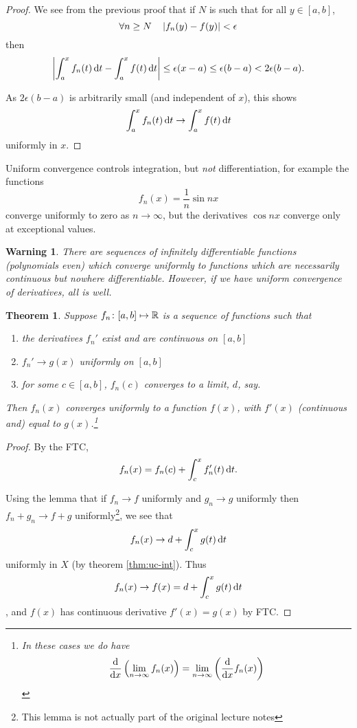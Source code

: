 \documentclass{notes}
\theoremstyle{plain}
\newtheorem{theorem}[proposition]{Theorem}
\newtheorem*{warning}{Warning}
\newcommand{\Forall}[1]{\forall #1 \quad}
\begin{document}
\begin{proof}
We see from the previous proof that if $ N $ is such that for all
$ y \in [a,b] $,
\[ \Forall{n \geq N} \abs{f_{n}(y) - f(y)} < \epsilon \] then
\[ \left|\int_{a}^{x}f_{n}(t)\,\mathrm{d} t - \int_{a}^{x}f(t)\,\mathrm{d} t\right| \leq 
\epsilon(x-a) \leq \epsilon(b-a) < 2\epsilon(b-a). \]

As $ 2 \epsilon (b-a) $ is arbitrarily small (and independent of $ 
x $), this shows
\[ \int_{a}^{x}f_{n}(t)\,\mathrm{d} t \to \int_{a}^{x}f(t)\,\mathrm{d} t \] 
uniformly in $ x $.
\end{proof}

Uniform convergence controls integration, but \emph{not} 
differentiation, for example the functions
\[ f_n(x) = \frac{1}{n}\sin n x \] converge uniformly to zero as $ 
n \to \infty $, but the derivatives $ \cos n x $ converge 
only at exceptional values.

\begin{warning}
There are sequences of infinitely differentiable functions 
(polynomials even) which converge uniformly to functions which are 
necessarily continuous but nowhere differentiable.
However, if we have uniform convergence of derivatives, all is well.
\end{warning}

\begin{theorem}
Suppose $ f_{n}\colon [a,b] \mapsto \mathbb{R} $ is a sequence of functions 
such that
\begin{enumerate}
\item the derivatives $ f_{n}' $ exist and are continuous on $ [a,b] $
\item $ f_{n}' \to g(x) $ uniformly on $ [a,b] $
\item for some $ c \in [a,b] $, $ f_{n}(c) $ converges to a 
limit, $ d $, say.
\end{enumerate}

Then $ f_{n}(x) $ converges uniformly to a function $ f(x) $, 
with $ f'(x) $ (continuous and) equal to $ g(x) $.\footnote{In 
these cases we do have \[ \frac{\mathrm{d}}{\mathrm{d} x}\left( \lim_{n \to 
\infty}f_{n}(x) \right) = \lim_{n \to \infty}\left( 
\frac{\mathrm{d}}{\mathrm{d} x}f_{n}(x) \right) \]}
\end{theorem}

\begin{proof}
By the FTC, \[ f_{n}(x) = f_{n}(c) + \int_{c}^{x}f_{n}'(t)\,\mathrm{d} t. \]

Using the lemma that if $ f_{n} \to f $ uniformly and $ 
g_{n} \to g $ uniformly then $ f_{n}+g_{n} \to f+g $ 
uniformly\footnote{This lemma is not actually part of the original 
lecture notes}, we see that
\[ f_{n}(x) \to d + \int_{c}^{x}g(t)\,\mathrm{d} t \] uniformly in $ X 
$ (by theorem \ref{thm:uc-int}).
Thus \[ f_{n}(x) \to f(x) = d + \int_{c}^{x}g(t)\,\mathrm{d} t \], and $ 
f(x) $ has continuous derivative $ f'(x)=g(x) $ by FTC.
\end{proof}
\end{document}
